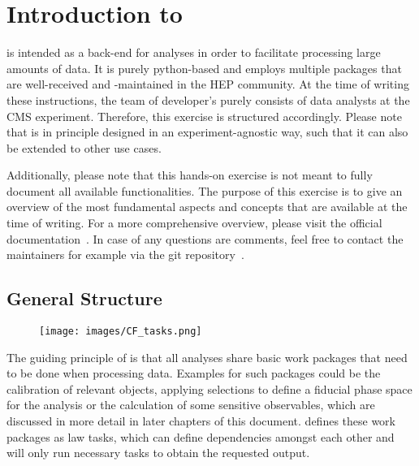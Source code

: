 \chapter{Introduction to \columnflow}
\columnflow is intended as a back-end for analyses in order to facilitate processing large amounts of data.
It is purely python-based and employs multiple packages that are well-received and {-maintained} in the HEP community.
At the time of writing these instructions, the team of developer's purely consists of data analysts at the CMS experiment.
Therefore, this exercise is structured accordingly.
Please note that \columnflow is in principle designed in an experiment-agnostic way, such that it can also be extended to other use cases.

Additionally, please note that this hands-on exercise is not meant to fully document all available functionalities.
The purpose of this exercise is to give an overview of the most fundamental aspects and concepts that are available at the time of writing.
For a more comprehensive overview, please visit the official documentation~\cite{cf_repo}. %
In case of any questions are comments, feel free to contact the maintainers for example via the git repository~\cite{cf_repo}.

\section{General Structure}
\begin{figure}[p]
	\centering
	\texttt{[image: images/CF\_tasks.png]}
	\label{fig:task_graph}
\end{figure}

The guiding principle of \columnflow is that all analyses share basic work packages that need to be done when processing data.
Examples for such packages could be the calibration of relevant objects, applying selections to define a fiducial phase space for the analysis or the calculation of some sensitive observables, which are discussed in more detail in later chapters of this document.
\columnflow defines these work packages as law tasks, which can define dependencies amongst each other and will only run necessary tasks to obtain the requested output.


